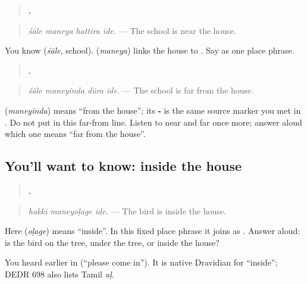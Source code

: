\begin{quote}
\textbf{   .}
\end{quote}

\begin{quote}
\emph{śāle maneya hattira ide.} — The school is near the house.
\end{quote}

You know \textbf{} (\emph{śāle}, school). \textbf{} (\emph{maneya}) links the house to \textbf{}. Say \textbf{ } as one place phrase.

\begin{grammarlens}[title={Grammar lens: far from the house}]
\begin{quote}
\textbf{   .}
\end{quote}

\begin{quote}
\emph{śāle maneyinda dūra ide.} — The school is far from the house.
\end{quote}

\textbf{} (\emph{maneyinda}) means “from the house”; its \textbf{-} is the same source marker you met in \textbf{}. Do not put \textbf{} in this far-from line. Listen to near and far once more; answer aloud which one means “far from the house”.
\end{grammarlens}

\subsection*{You'll want to know: inside the house}
\begin{quote}
\textbf{  .}
\end{quote}

\begin{quote}
\emph{hakki maneyoḷage ide.} — The bird is inside the house.
\end{quote}

Here \textbf{} (\emph{oḷage}) means “inside”. In this fixed place phrase it joins \textbf{} as \textbf{}. Answer aloud: is the bird on the tree, under the tree, or inside the house?

\begin{cousinweb}
You heard \textbf{} earlier in \textbf{ } (“please come in”). It is native Dravidian for “inside”; DEDR 698 also lists Tamil \emph{uḷ}.
\end{cousinweb}


